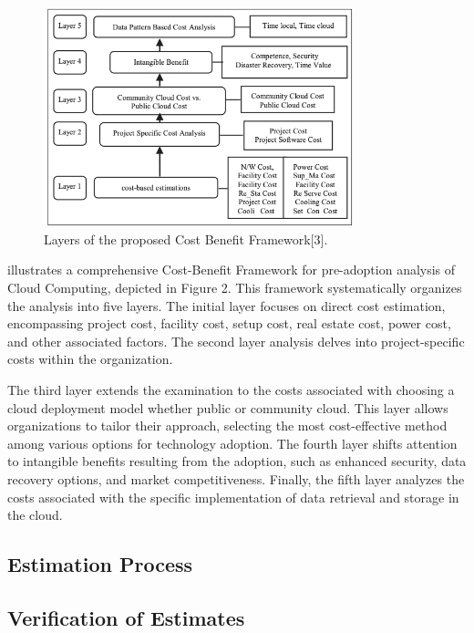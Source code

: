 \documentclass{article}
\begin{document}
\begin{figure}[h]
    \centering
    \includegraphics[width=0.8\textwidth]{Figure2.png}
    \caption{Layers of the proposed Cost Benefit Framework[3].}
    \label{fig:conceptual-model}
\end{figure}


\noindent [3] illustrates a comprehensive Cost-Benefit Framework for pre-adoption analysis of Cloud Computing, depicted in Figure 2. This framework systematically organizes the analysis into five layers. The initial layer focuses on direct cost estimation, encompassing project cost, facility cost, setup cost, real estate cost, power cost, and other associated factors. The second layer analysis delves into project-specific costs within the organization.

\noindent The third layer extends the examination to the costs associated with choosing a cloud deployment model whether public or community cloud. This layer allows organizations to tailor their approach, selecting the most cost-effective method among various options for technology adoption. The fourth layer shifts attention to intangible benefits resulting from the adoption, such as enhanced security, data recovery options, and market competitiveness. Finally, the fifth layer analyzes the costs associated with the specific implementation of data retrieval and storage in the cloud.


\subsection{Estimation Process}
\lipsum[15]

\subsection{Verification of Estimates}
\lipsum[16]
\end{document}
